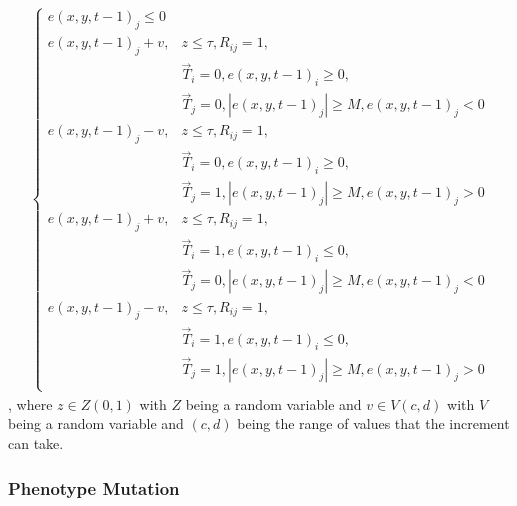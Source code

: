 \documentclass[\main/thesis.tex]{subfiles}
\begin{document}
\begin{align*}
\begin{cases}
                       e(x, y, t{-}1)_j {\le} 0 \\
                   e(x, y, t{-}1)_j {+} v,
                     & z {\le} \tau, R_{ij} {=} 1, \\
                     & \vec{T}_i {=} 0,
                       e(x, y, t{-}1)_i {\ge} 0, \\
                     & \vec{T}_j {=} 0,
                       |e(x, y, t{-}1)_j| {\ge} M,
                       e(x, y, t{-}1)_j {<} 0 \\                       
                   e(x, y, t{-}1)_j {-} v,
                     & z {\le} \tau, R_{ij} {=} 1, \\
                     & \vec{T}_i {=} 0,
                       e(x, y, t{-}1)_i {\ge} 0, \\ 
                     & \vec{T}_j {=} 1,
                       |e(x, y, t{-}1)_j| {\ge} M,
                       e(x, y, t{-}1)_j {>} 0 \\
                   e(x, y, t{-}1)_j {+} v,
                     & z {\le} \tau, R_{ij} {=} 1, \\
                     & \vec{T}_i {=} 1,
                       e(x, y, t{-}1)_i {\le} 0, \\ 
                     & \vec{T}_j {=} 0,
                       |e(x, y, t{-}1)_j| {\ge} M,
                       e(x, y, t{-}1)_j {<} 0 \\
                   e(x, y, t{-}1)_j {-} v,
                     & z {\le} \tau, R_{ij} {=} 1, \\
                     & \vec{T}_i {=} 1,
                       e(x, y, t{-}1)_i {\le} 0, \\ 
                     & \vec{T}_j {=} 1,
                       |e(x, y, t{-}1)_j| {\ge} M,
                       e(x, y, t{-}1)_j {>} 0 \\
                 \end{cases}
\end{align*}, where $z {\in} Z(0, 1)$ with $Z$ being a random variable and $v 
{\in} V(c, d)$ with $V$ being a random variable and $(c, d)$ being the range of 
values that the increment can take.  
                      

\subsubsection{Phenotype Mutation}
\end{document}
